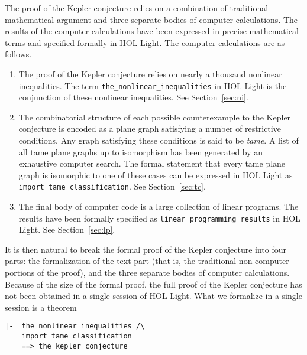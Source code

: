 The proof of the Kepler conjecture relies on a combination of
traditional mathematical argument and three separate bodies of
computer calculations.  The results of the computer calculations have
been expressed in precise mathematical terms and specified formally in
HOL Light.  The computer calculations are as follows.
\begin{enumerate}
\item The proof of the Kepler conjecture relies on nearly a thousand
  nonlinear inequalities.  
  The term \verb!the_nonlinear_inequalities! in HOL Light is the
  conjunction of these nonlinear inequalities.  See
  Section~\ref{sec:ni}.
\item The combinatorial structure of each possible counterexample to
  the Kepler conjecture is encoded as a plane graph satisfying a
  number of restrictive conditions.  Any graph satisfying these
  conditions is said to be {\it tame}.  A list of all tame plane graphs up
  to isomorphism has been generated by an exhaustive computer search.
  The formal statement that every tame plane graph is isomorphic to one of
  these cases can be expressed in HOL Light as
  \verb!import_tame_classification!.  See Section~\ref{sec:tc}.
\item The final body of computer code is a large collection of linear
  programs.  The results have been formally specified as
  \verb!linear_programming_results! in HOL Light.  See Section~\ref{sec:lp}.
\end{enumerate}

It is then natural to break the formal proof of the Kepler conjecture
into four parts: the formalization of the text part (that is, the
traditional non-computer portions of the proof), and the three
separate bodies of computer calculations.  Because of the size of the
formal proof, the full proof of the Kepler conjecture has not been
obtained in a single session of HOL Light.  What we formalize in a
single session is a theorem

\begin{obeylines}

\begin{verbatim}
|-  the_nonlinear_inequalities /\
    import_tame_classification
    ==> the_kepler_conjecture
\end{verbatim}

\end{obeylines}

